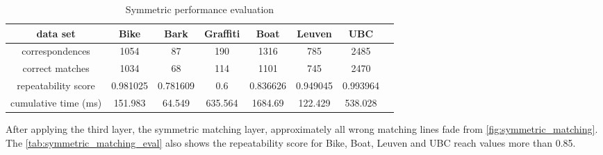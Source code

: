 \begin{table}[H]
  \begin{tabular}{| c || c | c | c | c | c | c | c |}
      \hline
      data set & Bike & Bark & Graffiti & Boat & Leuven & UBC \\ \hline \hline
      correspondences & 1054 & 87 & 190 & 1316 & 785 & 2485 \\ \hline
      correct matches & 1034 & 68 & 114 & 1101 & 745 & 2470 \\ \hline
      repeatability score & 0.981025 & 0.781609 & 0.6 & 0.836626 & 0.949045 & 0.993964 \\ \hline
      cumulative time (ms) & 151.983 & 64.549 & 635.564 & 1684.69 & 122.429 & 538.028 \\ \hline
  \end{tabular}
  \caption{Symmetric performance evaluation} \label{tab:symmetric_matching_eval}
\end{table}

After applying the third layer, the symmetric matching layer, approximately all wrong matching lines fade from \autoref{fig:symmetric_matching}. The \autoref{tab:symmetric_matching_eval} also shows the repeatability score for Bike, Boat, Leuven and UBC reach values more than 0.85.

